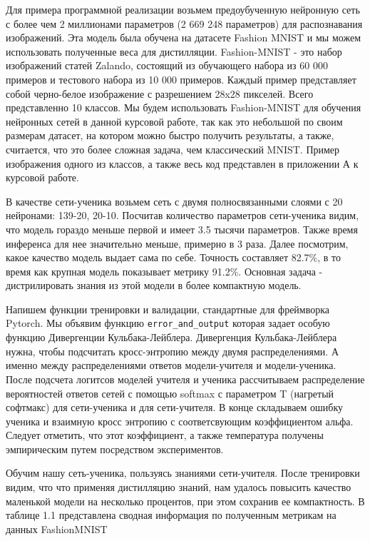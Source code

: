 \documentclass[oneside,final,12pt]{extreport}
\begin{document}
Для примера программной реализации возьмем предоубученную нейронную сеть с более чем 2 миллионами параметров (2 669 248 параметров) для распознавания изображений. Эта модель была обучена на датасете Fashion MNIST и мы можем использовать полученные веса для дистилляции. Fashion-MNIST - это набор изображений статей Zalando, состоящий из обучающего набора из 60 000 примеров и тестового набора из 10 000 примеров. Каждый пример представляет собой черно-белое изображение с разрешением 28x28 пикселей. Всего представленно 10 классов. Мы будем использовать Fashion-MNIST для обучения нейронных сетей в данной курсовой работе, так как это небольшой по своим размерам датасет, на котором можно быстро получить результаты, а также, считается, что это более сложная задача, чем классический MNIST. Пример изображения одного из классов, а также весь код представлен в приложении А к курсовой работе.

В качестве сети-ученика возьмем сеть с двумя полносвязанными слоями с 20 нейронами: 139-20, 20-10. Посчитав количество параметров сети-ученика видим, что модель гораздо меньше первой и имеет 3.5 тысячи параметров. Также время инференса для нее значительно меньше, примерно в 3 раза. Далее посмотрим, какое качество модель выдает сама по себе. Точность составляет 82.7\%, в то время как крупная модель показывает метрику 91.2\%. Основная задача - дистрилировать знания из этой модели в более компактную модель.

Напишем функции тренировки и валидации, стандартные для фреймворка Pytorch. Мы объявим функцию \texttt{error\_and\_output} которая задает особую функцию Дивергенции Кульбака-Лейблера. Дивергенция Кульбака-Лейблера нужна, чтобы подсчитать кросс-энтропию между двумя распределениями. А именно между распределениями ответов модели-учителя и модели-ученика. После подсчета логитсов моделей учителя и ученика рассчитываем распределение вероятностей ответов сетей с помощью softmax с параметром T (нагретый софтмакс) для сети-ученика и для сети-учителя. В конце складываем ошибку ученика и взаимную кросс энтропию с соответсвующим коэффициентом альфа. Следует отметить, что этот коэффициент, а также температура получены эмпирическим путем посредством экспериментов.

Обучим нашу сеть-ученика, пользуясь знаниями сети-учителя. После тренировки видим, что что применяя дистилляцию знаний, нам удалось повысить качество маленькой модели на несколько процентов, при этом сохранив ее компактность. В таблице 1.1 представлена сводная информация по полученным метрикам на данных FashionMNIST
\end{document}
